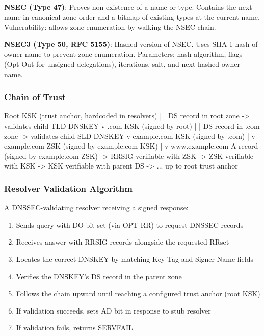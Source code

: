 \documentclass[11pt,letterpaper]{article}
\begin{document}
\textbf{NSEC (Type 47)}: Proves non-existence of a name or type. Contains the next name in canonical zone order and a bitmap of existing types at the current name. Vulnerability: allows zone enumeration by walking the NSEC chain.

\textbf{NSEC3 (Type 50, RFC 5155)}: Hashed version of NSEC. Uses SHA-1 hash of owner name to prevent zone enumeration. Parameters: hash algorithm, flags (Opt-Out for unsigned delegations), iterations, salt, and next hashed owner name.

\subsubsection{Chain of Trust}

\begin{asciibox}
Root KSK (trust anchor, hardcoded in resolvers)
  |
  | DS record in root zone -> validates child TLD DNSKEY
  v
.com KSK (signed by root)
  |
  | DS record in .com zone -> validates child SLD DNSKEY
  v
example.com KSK (signed by .com)
  |
  v
example.com ZSK (signed by example.com KSK)
  |
  v
www.example.com A record (signed by example.com ZSK)
  -> RRSIG verifiable with ZSK
  -> ZSK verifiable with KSK
  -> KSK verifiable with parent DS
  -> ... up to root trust anchor
\end{asciibox}

\subsubsection{Resolver Validation Algorithm}

A DNSSEC-validating resolver receiving a signed response:
\begin{enumerate}
  \item Sends query with DO bit set (via OPT RR) to request DNSSEC records
  \item Receives answer with RRSIG records alongside the requested RRset
  \item Locates the correct DNSKEY by matching Key Tag and Signer Name fields
  \item Verifies the DNSKEY's DS record in the parent zone
  \item Follows the chain upward until reaching a configured trust anchor (root KSK)
  \item If validation succeeds, sets AD bit in response to stub resolver
  \item If validation fails, returns SERVFAIL
\end{enumerate}
\end{document}
